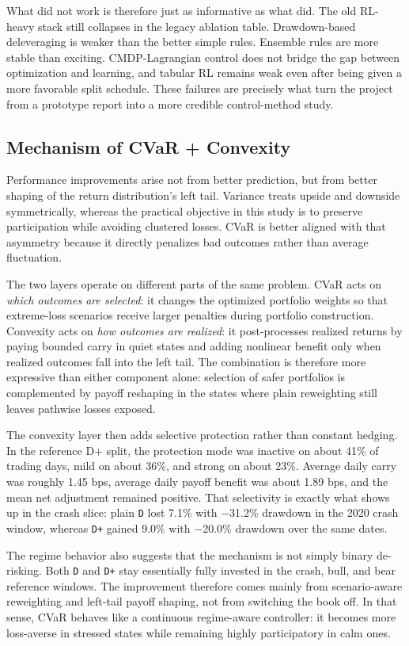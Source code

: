 \documentclass[11pt]{article}
\begin{document}
What did not work is therefore just as informative as what did. The old
RL-heavy stack still collapses in the legacy ablation table. Drawdown-based
deleveraging is weaker than the better simple rules. Ensemble rules are more
stable than exciting. CMDP-Lagrangian control does not bridge the gap between
optimization and learning, and tabular RL remains weak even after being given a
more favorable split schedule. These failures are precisely what turn the
project from a prototype report into a more credible control-method study.

\subsection{Mechanism of CVaR + Convexity}

Performance improvements arise not from better prediction, but from better
shaping of the return distribution's left tail. Variance treats upside and
downside symmetrically, whereas the practical objective in this study is to
preserve participation while avoiding clustered losses. CVaR is better aligned
with that asymmetry because it directly penalizes bad outcomes rather than
average fluctuation.

The two layers operate on different parts of the same problem. CVaR acts on
\emph{which outcomes are selected}: it changes the optimized portfolio weights
so that extreme-loss scenarios receive larger penalties during portfolio
construction. Convexity acts on \emph{how outcomes are realized}: it
post-processes realized returns by paying bounded carry in quiet states and
adding nonlinear benefit only when realized outcomes fall into the left tail.
The combination is therefore more expressive than either component alone:
selection of safer portfolios is complemented by payoff reshaping in the states
where plain reweighting still leaves pathwise losses exposed.

The convexity layer then adds selective protection rather than constant
hedging. In the reference D+ split, the protection mode was inactive on about
41\% of trading days, mild on about 36\%, and strong on about 23\%. Average
daily carry was roughly 1.45 bps, average daily payoff benefit was about
1.89 bps, and the mean net adjustment remained positive. That selectivity is
exactly what shows up in the crash slice: plain \texttt{D} lost 7.1\% with
$-$31.2\% drawdown in the 2020 crash window, whereas \texttt{D+} gained 9.0\%
with $-$20.0\% drawdown over the same dates.

The regime behavior also suggests that the mechanism is not simply binary
de-risking. Both \texttt{D} and \texttt{D+} stay essentially fully invested in
the crash, bull, and bear reference windows. The improvement therefore comes
mainly from scenario-aware reweighting and left-tail payoff shaping, not from
switching the book off. In that sense, CVaR behaves like a continuous
regime-aware controller: it becomes more loss-averse in stressed states while
remaining highly participatory in calm ones.
\end{document}
